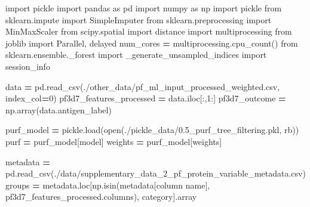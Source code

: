 \documentclass[
  11pt,
  oneside]{book}
\newenvironment{Shaded}{\begin{snugshade}}{\end{snugshade}}
\newcommand{\BuiltInTok}[1]{#1}
\newcommand{\DecValTok}[1]{\textcolor[rgb]{0.00,0.00,0.81}{#1}}
\newcommand{\ImportTok}[1]{#1}
\newcommand{\NormalTok}[1]{#1}
\newcommand{\OperatorTok}[1]{\textcolor[rgb]{0.81,0.36,0.00}{\textbf{#1}}}
\newcommand{\StringTok}[1]{\textcolor[rgb]{0.31,0.60,0.02}{#1}}
\begin{document}
\begin{Shaded}
\begin{Highlighting}[]
\ImportTok{import}\NormalTok{ pickle}
\ImportTok{import}\NormalTok{ pandas }\ImportTok{as}\NormalTok{ pd}
\ImportTok{import}\NormalTok{ numpy }\ImportTok{as}\NormalTok{ np}
\ImportTok{import}\NormalTok{ pickle}
\ImportTok{from}\NormalTok{ sklearn.impute }\ImportTok{import}\NormalTok{ SimpleImputer}
\ImportTok{from}\NormalTok{ sklearn.preprocessing }\ImportTok{import}\NormalTok{ MinMaxScaler}
\ImportTok{from}\NormalTok{ scipy.spatial }\ImportTok{import}\NormalTok{ distance}
\ImportTok{import}\NormalTok{ multiprocessing}
\ImportTok{from}\NormalTok{ joblib }\ImportTok{import}\NormalTok{ Parallel, delayed}
\NormalTok{num\_cores }\OperatorTok{=}\NormalTok{ multiprocessing.cpu\_count()}
\ImportTok{from}\NormalTok{ sklearn.ensemble.\_forest }\ImportTok{import}\NormalTok{ \_generate\_unsampled\_indices}
\ImportTok{import}\NormalTok{ session\_info}
\end{Highlighting}
\end{Shaded}

\begin{Shaded}
\begin{Highlighting}[]
\NormalTok{data }\OperatorTok{=}\NormalTok{ pd.read\_csv(}\StringTok{\textquotesingle{}./other\_data/pf\_ml\_input\_processed\_weighted.csv\textquotesingle{}}\NormalTok{, index\_col}\OperatorTok{=}\DecValTok{0}\NormalTok{)}
\NormalTok{pf3d7\_features\_processed }\OperatorTok{=}\NormalTok{ data.iloc[:,}\DecValTok{1}\NormalTok{:]}
\NormalTok{pf3d7\_outcome }\OperatorTok{=}\NormalTok{ np.array(data.antigen\_label)}

\NormalTok{purf\_model }\OperatorTok{=}\NormalTok{ pickle.load(}\BuiltInTok{open}\NormalTok{(}\StringTok{\textquotesingle{}./pickle\_data/0.5\_purf\_tree\_filtering.pkl\textquotesingle{}}\NormalTok{, }\StringTok{\textquotesingle{}rb\textquotesingle{}}\NormalTok{))}
\NormalTok{purf }\OperatorTok{=}\NormalTok{ purf\_model[}\StringTok{\textquotesingle{}model\textquotesingle{}}\NormalTok{]}
\NormalTok{weights }\OperatorTok{=}\NormalTok{ purf\_model[}\StringTok{\textquotesingle{}weights\textquotesingle{}}\NormalTok{]}

\NormalTok{metadata }\OperatorTok{=}\NormalTok{ pd.read\_csv(}\StringTok{\textquotesingle{}./data/supplementary\_data\_2\_pf\_protein\_variable\_metadata.csv\textquotesingle{}}\NormalTok{)}
\NormalTok{groups }\OperatorTok{=}\NormalTok{ metadata.loc[np.isin(metadata[}\StringTok{\textquotesingle{}column name\textquotesingle{}}\NormalTok{], pf3d7\_features\_processed.columns), }\StringTok{\textquotesingle{}category\textquotesingle{}}\NormalTok{].array}
\end{Highlighting}
\end{Shaded}
\end{document}
